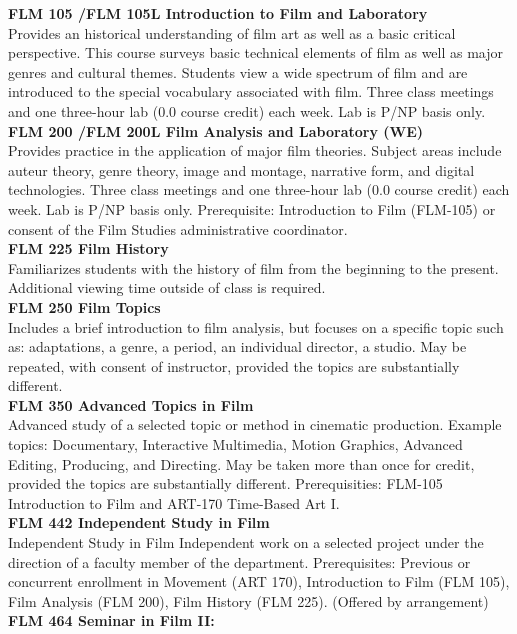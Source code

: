 \documentclass[
  letterpaper,
]{scrbook}
\begin{document}
\textbf{FLM 105 /FLM 105L Introduction to Film and Laboratory}\\
Provides an historical understanding of film art as well as a basic
critical perspective. This course surveys basic technical elements of
film as well as major genres and cultural themes. Students view a wide
spectrum of film and are introduced to the special vocabulary associated
with film. Three class meetings and one three-hour lab (0.0 course
credit) each week. Lab is P/NP basis only.\\
\textbf{FLM 200 /FLM 200L Film Analysis and Laboratory (WE)}\\
Provides practice in the application of major film theories. Subject
areas include auteur theory, genre theory, image and montage, narrative
form, and digital technologies. Three class meetings and one three-hour
lab (0.0 course credit) each week. Lab is P/NP basis only. Prerequisite:
Introduction to Film (FLM-105) or consent of the Film Studies
administrative coordinator.\\
\textbf{FLM 225 Film History}\\
Familiarizes students with the history of film from the beginning to the
present. Additional viewing time outside of class is required.\\
\textbf{FLM 250 Film Topics}\\
Includes a brief introduction to film analysis, but focuses on a
specific topic such as: adaptations, a genre, a period, an individual
director, a studio. May be repeated, with consent of instructor,
provided the topics are substantially different.\\
\textbf{FLM 350 Advanced Topics in Film}\\
Advanced study of a selected topic or method in cinematic production.
Example topics: Documentary, Interactive Multimedia, Motion Graphics,
Advanced Editing, Producing, and Directing. May be taken more than once
for credit, provided the topics are substantially different.
Prerequisities: FLM-105 Introduction to Film and ART-170 Time-Based Art
I.\\
\textbf{FLM 442 Independent Study in Film}\\
Independent Study in Film Independent work on a selected project under
the direction of a faculty member of the department. Prerequisites:
Previous or concurrent enrollment in Movement (ART 170), Introduction to
Film (FLM 105), Film Analysis (FLM 200), Film History (FLM 225).
(Offered by arrangement)\\
\textbf{FLM 464 Seminar in Film II:}\\
\end{document}
